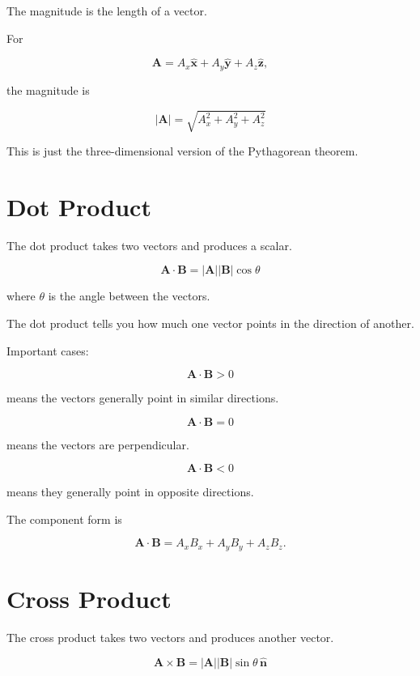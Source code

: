 \documentclass[11pt]{article}
\newcommand{\vect}[1]{\mathbf{#1}}
\newcommand{\uvect}[1]{\hat{\mathbf{#1}}}
\begin{document}
The magnitude is the length of a vector.

For

\[
\vect{A}
=
A_x\uvect{x}
+
A_y\uvect{y}
+
A_z\uvect{z},
\]

the magnitude is

\[
\boxed{
|\vect{A}|
=
\sqrt{
A_x^2+A_y^2+A_z^2
}
}
\]

This is just the three-dimensional version of the Pythagorean theorem.



\section{Dot Product}

The dot product takes two vectors and produces a scalar.

\[
\boxed{
\vect{A}\cdot\vect{B}
=
|\vect{A}||\vect{B}|\cos\theta
}
\]

where $\theta$ is the angle between the vectors.

The dot product tells you how much one vector points in the direction of another.

Important cases:

\[
\vect{A}\cdot\vect{B}>0
\]

means the vectors generally point in similar directions.

\[
\vect{A}\cdot\vect{B}=0
\]

means the vectors are perpendicular.

\[
\vect{A}\cdot\vect{B}<0
\]

means they generally point in opposite directions.

The component form is

\[
\vect{A}\cdot\vect{B}
=
A_xB_x+A_yB_y+A_zB_z.
\]



\section{Cross Product}

The cross product takes two vectors and produces another vector.

\[
\boxed{
\vect{A}\times\vect{B}
=
|\vect{A}||\vect{B}|
\sin\theta\,
\hat{\vect{n}}
}
\]
\end{document}
